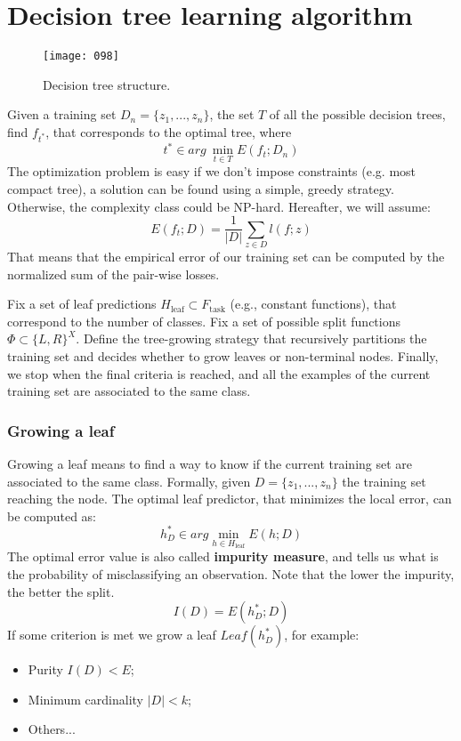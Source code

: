 \section{Decision tree learning algorithm}
\begin{figure}[t]
\begin{center}
    \texttt{[image: 098]}
\end{center}
\caption{Decision tree structure.}
\label{fig:098}
\end{figure}
Given a training set \(D_n=\{z_1,...,z_n\}\), the set \(T\) of all the possible decision trees, find \(f_{t^*}\), that corresponds to the optimal tree, where 
\begin{equation}
    t^* \in arg\ \min_{t \in T} E(f_t;D_n)
\end{equation}
The optimization problem is easy if we don't impose constraints (e.g. most compact tree), a solution can be found using a simple, greedy strategy. Otherwise, the complexity class could be NP-hard. Hereafter, we will assume:
\begin{equation}
    E(f_t; D) = \frac 1 {|D|} \sum_{z \in D} l(f;z)
\end{equation}
That means that the empirical error of our training set can be computed by the normalized sum of the pair-wise losses.

Fix a set of leaf predictions \(H_\text{leaf} \subset F_\text{task}\) (e.g., constant functions), that correspond to the number of classes. Fix a set of possible split functions \(\Phi \subset \{L,R\}^X\). Define the tree-growing strategy that recursively partitions the training set and decides whether to grow leaves or non-terminal nodes. Finally, we stop when the final criteria is reached, and all the examples of the current training set are associated to the same class. 

\subsubsection{Growing a leaf}
Growing a leaf means to find a way to know if the current training set are associated to the same class. Formally, given \(D = \{z_1,...,z_n\}\) the training set reaching the node. The optimal leaf predictor, that minimizes the local error, can be computed as:
\begin{equation}
    h_D^* \in arg \min_{h \in H_\text{leaf}} E(h;D)
\end{equation}
The optimal error value is also called \textbf{impurity measure}, and tells us what is the probability of misclassifying an observation. Note that the lower the impurity, the better the split.
\begin{equation}
    I(D) = E(h_D^*; D)
\end{equation}
If some criterion is met we grow a leaf \(Leaf(h_D^*)\), for example:
\begin{itemize}
    \item 
    Purity \(I(D) < E\);
    \item
    Minimum cardinality \(|D| < k\);
    \item
    Others...
\end{itemize}

